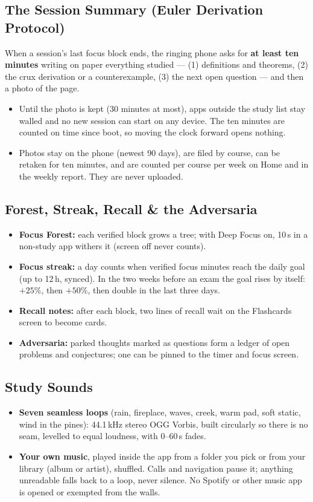 \documentclass[11pt,a4paper]{article}
\begin{document}
\subsection{The Session Summary (Euler Derivation Protocol)}
When a session's last focus block ends, the ringing phone asks for \textbf{at least ten minutes} writing on paper everything studied --- (1) definitions and theorems, (2) the crux derivation or a counterexample, (3) the next open question --- and then a photo of the page.
\begin{itemize}
  \item Until the photo is kept (30 minutes at most), apps outside the study list stay walled and no new session can start on any device. The ten minutes are counted on time since boot, so moving the clock forward opens nothing.
  \item Photos stay on the phone (newest 90 days), are filed by course, can be retaken for ten minutes, and are counted per course per week on Home and in the weekly report. They are never uploaded.
\end{itemize}

\subsection{Forest, Streak, Recall \& the Adversaria}
\begin{itemize}
  \item \textbf{Focus Forest:} each verified block grows a tree; with Deep Focus on, 10\,s in a non-study app withers it (screen off never counts).
  \item \textbf{Focus streak:} a day counts when verified focus minutes reach the daily goal (up to 12\,h, synced). In the two weeks before an exam the goal rises by itself: $+25\%$, then $+50\%$, then double in the last three days.
  \item \textbf{Recall notes:} after each block, two lines of recall wait on the Flashcards screen to become cards.
  \item \textbf{Adversaria:} parked thoughts marked as questions form a ledger of open problems and conjectures; one can be pinned to the timer and focus screen.
\end{itemize}

\subsection{Study Sounds}
\begin{itemize}
  \item \textbf{Seven seamless loops} (rain, fireplace, waves, creek, warm pad, soft static, wind in the pines): 44.1\,kHz stereo OGG Vorbis, built circularly so there is no seam, levelled to equal loudness, with 0--60\,s fades.
  \item \textbf{Your own music}, played inside the app from a folder you pick or from your library (album or artist), shuffled. Calls and navigation pause it; anything unreadable falls back to a loop, never silence. No Spotify or other music app is opened or exempted from the walls.
\end{itemize}
\end{document}
